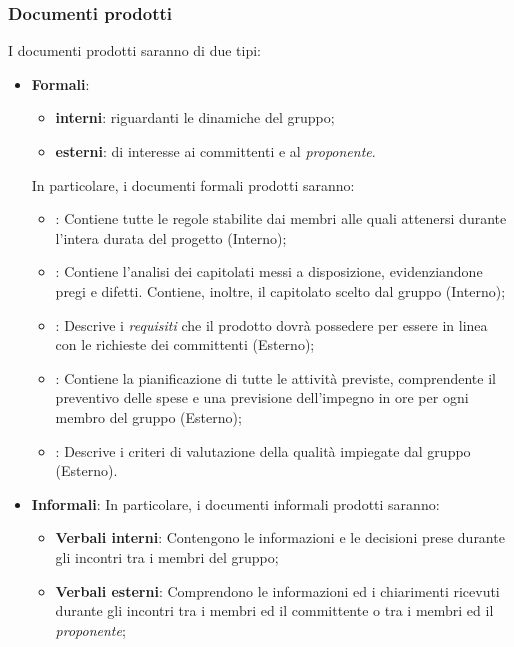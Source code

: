 	\subsubsection{Documenti prodotti}
		I documenti prodotti saranno di due tipi:
			\begin{itemize}
				\item \textbf{Formali}:
				\begin{itemize}
					\item \textbf{interni}: riguardanti le dinamiche del gruppo;
					\item \textbf{esterni}: di interesse ai committenti e al \emph{proponente}.
				\end{itemize} 
				In particolare, i documenti formali prodotti saranno:
					\begin{itemize}
						\item \textbf{\NdP}: Contiene tutte le regole stabilite dai membri alle quali attenersi durante l'intera durata del progetto (Interno);
						\item \textbf{\VdC}: Contiene l'analisi dei capitolati messi a disposizione, evidenziandone pregi e difetti. Contiene, inoltre, il capitolato scelto dal gruppo (Interno);
						\item \textbf{\AdR}: Descrive i \emph{requisiti} che il prodotto dovrà possedere per essere in linea con le richieste dei committenti (Esterno);
						\item \textbf{\PdP}: Contiene la pianificazione di tutte le attività previste, comprendente il preventivo delle spese e una previsione dell'impegno in ore per ogni membro del gruppo (Esterno);
						\item \textbf{\PdQ}: Descrive i criteri di valutazione della qualità impiegate dal gruppo (Esterno).
					\end{itemize}
		
			\item \textbf{Informali}: 
			In particolare, i documenti informali prodotti saranno:
				\begin{itemize}
					\item \textbf{Verbali interni}: Contengono le informazioni e le decisioni prese durante gli incontri tra i membri del gruppo;
					\item \textbf{Verbali esterni}: Comprendono le informazioni ed i chiarimenti ricevuti durante gli incontri tra i membri ed il committente o tra i membri ed il \emph{proponente};
				\end{itemize}
		\end{itemize}
	
